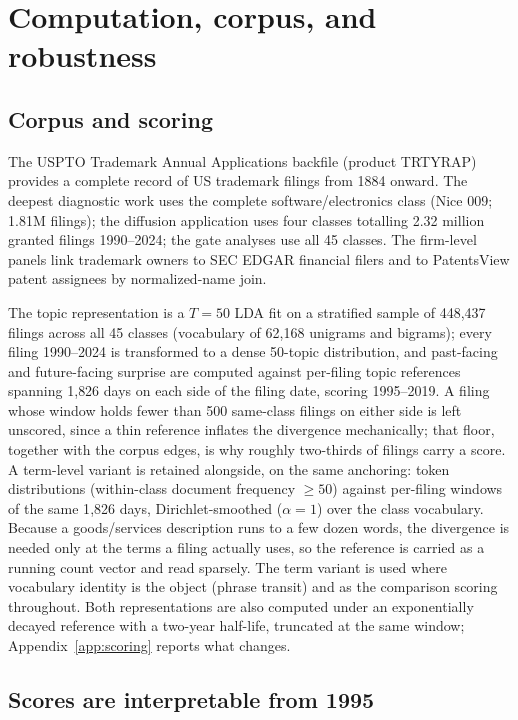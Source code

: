 \documentclass[11pt]{article}
\begin{document}
\appendix

\section{Computation, corpus, and robustness}\label{app:comp}

\subsection{Corpus and scoring}

The USPTO Trademark Annual Applications backfile (product TRTYRAP)
provides a complete record of US trademark filings from 1884 onward. The
deepest diagnostic work uses the complete software/electronics class
(Nice 009; 1.81M filings); the diffusion application uses four classes
totalling 2.32 million granted filings 1990--2024; the gate analyses use
all 45 classes. The firm-level panels link trademark owners to SEC EDGAR
financial filers and to PatentsView patent assignees by normalized-name
join.

The topic representation is a $T = 50$ LDA fit on a stratified sample of
448{,}437 filings across all 45 classes (vocabulary of 62{,}168 unigrams
and bigrams); every filing 1990--2024 is transformed to a dense 50-topic
distribution, and past-facing and future-facing surprise are computed against
per-filing topic references spanning 1{,}826 days on each side of the filing
date, scoring 1995--2019. A filing whose window holds fewer than 500
same-class filings on either side is left unscored, since a thin reference
inflates the divergence mechanically; that floor, together with the corpus
edges, is why roughly two-thirds of filings carry a score. A term-level variant is retained
alongside, on the same anchoring: token distributions (within-class
document frequency $\geq 50$) against per-filing windows of the same
1{,}826 days, Dirichlet-smoothed ($\alpha = 1$) over the class vocabulary.
Because a goods/services description runs to a few dozen words, the
divergence is needed only at the terms a filing actually uses, so the
reference is carried as a running count vector and read sparsely. The term
variant is used where vocabulary identity is the object (phrase transit)
and as the comparison scoring throughout. Both representations are also computed under an
exponentially decayed reference with a two-year half-life, truncated at the
same window; Appendix~\ref{app:scoring} reports what changes.

\subsection{Scores are interpretable from 1995}
\end{document}
